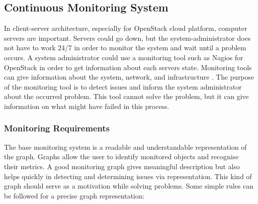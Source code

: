 \subsection{Continuous Monitoring System}\label{Continuous Monitoring System}

In client-server architecture, especially for OpenStack cloud platform, computer servers are important. Servers could go down, but the system-administrator does not have to work 24/7 in order to monitor the system and wait until a problem occurs. A system administrator could use a monitoring tool such as Nagios for OpenStack in order to get information about each servers state. Monitoring tools can give information about the system, network, and infrastructure \cite{nagios}. The purpose of the monitoring tool is to detect issues and inform the system administrator about the occurred problem. This tool cannot solve the problem, but it can give information on what might have failed in this process.
 
\subsubsection{Monitoring Requirements}\label{Monitoring requirements}

The base monitoring system is a readable and understandable representation of the graph. Graphs allow the user to identify monitored objects and recognise their metrics. 
A good monitoring graph gives meaningful description but also helps quickly in detecting and determining issues via representation. This kind of graph should serve as a motivation while solving problems. 
Some simple rules can be followed for a precise graph representation:

